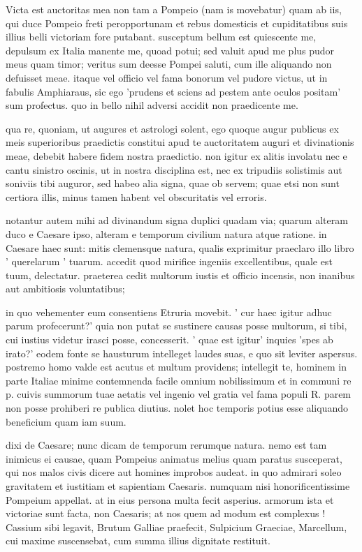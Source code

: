  Victa est auctoritas mea non tam a Pompeio (nam is movebatur) quam ab iis, qui duce Pompeio freti peropportunam et rebus domesticis et cupiditatibus suis illius belli victoriam fore putabant. susceptum bellum est quiescente me, depulsum ex Italia manente me, quoad potui; sed valuit apud me plus pudor meus quam timor; veritus sum deesse Pompei saluti, cum ille aliquando non defuisset meae. itaque vel officio vel fama bonorum vel pudore victus, ut in fabulis Amphiaraus, sic ego 'prudens et sciens ad pestem ante oculos positam' sum profectus. quo in bello nihil adversi accidit non praedicente me.

 qua re, quoniam, ut augures et astrologi solent, ego quoque augur publicus ex meis superioribus praedictis constitui apud te auctoritatem auguri et divinationis meae, debebit habere fidem nostra praedictio. non igitur ex alitis involatu nec e cantu sinistro oscinis, ut in nostra disciplina est, nec ex tripudiis solistimis aut soniviis tibi auguror, sed habeo alia signa, quae ob servem; quae etsi non sunt certiora illis, minus tamen habent vel obscuritatis vel erroris.

 notantur autem mihi ad divinandum signa duplici quadam via; quarum alteram duco e Caesare ipso, alteram e temporum civilium natura atque ratione. in Caesare haec sunt: mitis clemensque natura, qualis exprimitur praeclaro illo libro ' querelarum ' tuarum. accedit quod mirifice ingeniis excellentibus, quale est tuum, delectatur. praeterea cedit multorum iustis et officio incensis, non inanibus aut ambitiosis voluntatibus;

 in quo vehementer eum consentiens Etruria movebit. ' cur haec igitur adhuc parum profecerunt?' quia non putat se sustinere causas posse multorum, si tibi, cui iustius videtur irasci posse, concesserit. ' quae est igitur' inquies 'spes ab irato?' eodem fonte se hausturum intelleget laudes suas, e quo sit leviter aspersus. postremo homo valde est acutus et multum providens; intellegit te, hominem in parte Italiae minime contemnenda facile omnium nobilissimum et in communi re p. cuivis summorum tuae aetatis vel ingenio vel gratia vel fama populi R. parem non posse prohiberi re publica diutius. nolet hoc temporis potius esse aliquando beneficium quam iam suum.

 dixi de Caesare; nunc dicam de temporum rerumque natura. nemo est tam inimicus ei causae, quam Pompeius animatus melius quam paratus susceperat, qui nos malos civis dicere aut homines improbos audeat. in quo admirari soleo gravitatem et iustitiam et sapientiam Caesaris. numquam nisi honorificentissime Pompeium appellat. at in eius persona multa fecit asperius. armorum ista et victoriae sunt facta, non Caesaris; at nos quem ad modum est complexus ! Cassium sibi legavit, Brutum Galliae praefecit, Sulpicium Graeciae, Marcellum, cui maxime suscensebat, cum summa illius dignitate restituit.

